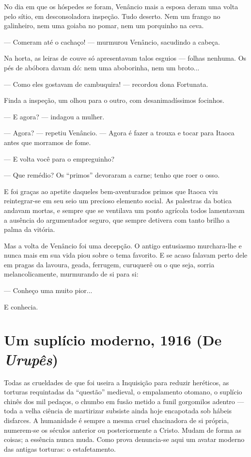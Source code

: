 No dia em que os hóspedes se foram, Venâncio mais a esposa deram uma
volta pelo sítio, em desconsoladora inspeção. Tudo deserto. Nem um
frango no galinheiro, nem uma goiaba no pomar, nem um porquinho na ceva.

--- Comeram até o cachaço! --- murmurou Venâncio, sacudindo a cabeça.

Na horta, as leiras de couve só apresentavam talos esguios --- folhas
nenhuma. Os pés de abóbora davam dó: nem uma aboborinha, nem um broto...

--- Como eles gostavam de cambuquira! --- recordou dona Fortunata.

Finda a inspeção, um olhou para o outro, com desanimadíssimos focinhos.

--- E agora? --- indagou a mulher.

--- Agora? --- repetiu Venâncio. --- Agora é fazer a trouxa e tocar para
Itaoca antes que morramos de fome.

--- E volta você para o empreguinho?

--- Que remédio? Os ``primos'' devoraram a carne; tenho que roer o osso.

E foi graças ao apetite daqueles bem-aventurados primos que Itaoca viu
reintegrar-se em seu seio um precioso elemento social. As palestras da
botica andavam mortas, e sempre que se ventilava um ponto agrícola todos
lamentavam a ausência do argumentador seguro, que sempre detivera com
tanto brilho a palma da vitória.

Mas a volta de Venâncio foi uma decepção. O antigo entusiasmo
murchara-lhe e nunca mais em sua vida piou sobre o tema favorito. E se
acaso falavam perto dele em pragas da lavoura, geada, ferrugem,
curuquerê ou o que seja, sorria melancolicamente, murmurando de si para
si:

--- Conheço uma muito pior...

E conhecia.

\chapter{Um suplício moderno, 1916 (De \emph{Urupês})}

Todas as crueldades de que foi useira a Inquisição para reduzir
heréticos, as torturas requintadas da ``questão'' medieval, o
empalamento otomano, o suplício chinês dos mil pedaços, o chumbo em
fusão metido a funil gorgomilos adentro --- toda a velha ciência de
martirizar subsiste ainda hoje encapotada sob hábeis disfarces. A
humanidade é sempre a mesma cruel chacinadora de si própria, numerem-se
os séculos anterior ou posteriormente a Cristo. Mudam de forma as
coisas; a essência nunca muda. Como prova denuncia-se aqui um avatar
moderno das antigas torturas: o estafetamento.

